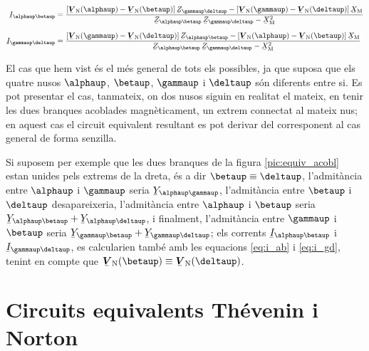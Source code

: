 \begin{subequations}
\begin{align}
    \cmplx{I}_{\alphaup\betaup} &=  \frac{[\mcmplx{V}\ped{N}(\alphaup) - \mcmplx{V}\ped{N}(\betaup)] \, \cmplx{Z}_{\gammaup\deltaup} - [\mcmplx{V}\ped{N}(\gammaup) - \mcmplx{V}\ped{N}(\deltaup)] \,
    \cmplx{X}\ped{M}}{\cmplx{Z}_{\alphaup\betaup}\,
    \cmplx{Z}_{\gammaup\deltaup}-\cmplx{X}\ped{M}^2} \label{eq:i_ab}
    \\[1.5ex]
    \cmplx{I}_{\gammaup\deltaup} &= \frac{[\mcmplx{V}\ped{N}(\gammaup) - \mcmplx{V}\ped{N}(\deltaup)] \, \cmplx{Z}_{\alphaup\betaup} - [\mcmplx{V}\ped{N}(\alphaup) - \mcmplx{V}\ped{N}(\betaup)] \,
    \cmplx{X}\ped{M}}{\cmplx{Z}_{\alphaup\betaup}\,
    \cmplx{Z}_{\gammaup\deltaup}-\cmplx{X}\ped{M}^2} \label{eq:i_gd}
\end{align}
\end{subequations}

El cas que hem vist  és el més general de tots els
possibles, ja que suposa que els quatre nusos $\alphaup$, $\betaup$,
$\gammaup$ i $\deltaup$ són diferents entre si. Es pot presentar el cas,
tanmateix, on dos nusos siguin en realitat el mateix, en tenir les
dues branques acoblades magnèticament, un extrem connectat al mateix
nus; en aquest cas el circuit equivalent resultant es pot derivar
del corresponent al cas general de forma senzilla.

Si suposem per exemple que les dues branques de la figura
\vref{pic:equiv_acobl} estan unides pels extrems de la dreta,
és a dir $\betaup\equiv\deltaup$, l'admitància entre
$\alphaup$ i $\gammaup$ seria $\cmplx{Y}_{\alphaup\gammaup}$, l'admitància
entre $\betaup$ i $\deltaup$ desapareixeria, l'admitància entre $\alphaup$
i $\betaup$ seria $\cmplx{Y}_{\alphaup\betaup} +
\cmplx{Y}_{\alphaup\deltaup}$, i finalment, l'admitància entre $\gammaup$
i $\betaup$ seria $\cmplx{Y}_{\gammaup\betaup} +
\cmplx{Y}_{\gammaup\deltaup}$; els corrents $\cmplx{I}_{\alphaup\betaup}$ i
$\cmplx{I}_{\gammaup\deltaup}$, es calcularien també amb les equacions
\eqref{eq:i_ab} i \eqref{eq:i_gd}, tenint en compte que
$\mcmplx{V}\ped{N}(\betaup)\equiv\mcmplx{V}\ped{N}(\deltaup)$.

\section{Circuits equivalents Thévenin i Norton}   \label{sec:xarxes_Zth}


